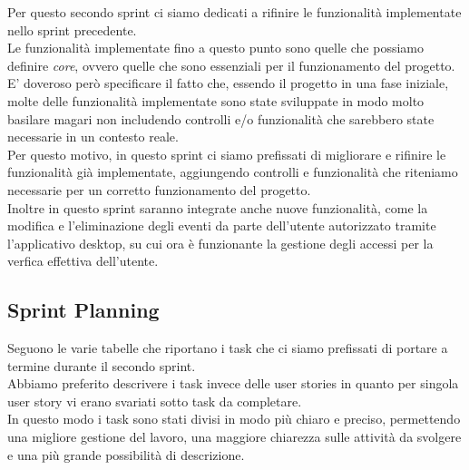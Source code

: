 \documentclass{article}
\begin{document}
Per questo secondo sprint ci siamo dedicati a rifinire le funzionalità implementate nello sprint precedente.\\
Le funzionalità implementate fino a questo punto sono quelle che possiamo definire \textit{core}, ovvero quelle che sono essenziali per il funzionamento del progetto.\\
E' doveroso però specificare il fatto che, essendo il progetto in una fase iniziale, molte delle funzionalità implementate sono state sviluppate in modo molto basilare magari non includendo controlli e/o funzionalità che sarebbero state necessarie in un contesto reale.\\
Per questo motivo, in questo sprint ci siamo prefissati di migliorare e rifinire le funzionalità già implementate, aggiungendo controlli e funzionalità che riteniamo necessarie per un corretto funzionamento del progetto.\\

Inoltre in questo sprint saranno integrate anche nuove funzionalità, come la modifica e l'eliminazione degli eventi da parte dell'utente autorizzato tramite l'applicativo desktop, su cui ora è funzionante la gestione degli accessi per la verfica effettiva dell'utente.\\

\subsection{Sprint Planning}
Seguono le varie tabelle che riportano i task che ci siamo prefissati di portare a termine durante il secondo sprint.\\
Abbiamo preferito descrivere i task invece delle user stories in quanto per singola user story vi erano svariati sotto task da completare.\\
In questo modo i task sono stati divisi in modo più chiaro e preciso, permettendo una migliore gestione del lavoro, una maggiore chiarezza sulle attività da svolgere e una più grande possibilità di descrizione.\\
\end{document}
